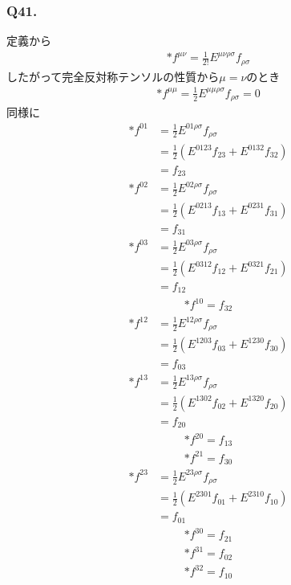 \documentclass[uplatex,a4j,11pt,dvipdfmx]{jsarticle}
\begin{document}
\subsubsection*{Q41.}
定義から
\begin{align}
  *f^{\mu\nu}=\frac{1}{2!}E^{\mu\nu\rho\sigma}f_{\rho\sigma}
\end{align}
したがって完全反対称テンソルの性質から$\mu=\nu$のとき
\begin{align*}
  *f^{\mu\mu}=\frac{1}{2}E^{\mu\mu\rho\sigma}f_{\rho\sigma}=0
\end{align*}
同様に
\begin{align*}
  *f^{01}&=\frac{1}{2}E^{01\rho\sigma}f_{\rho\sigma}\\
  &=\frac{1}{2}\left(E^{0123}f_{23}+E^{0132}f_{32}\right)\\
  &=f_{23}
\end{align*}
\begin{align*}
  *f^{02}&=\frac{1}{2}E^{02\rho\sigma}f_{\rho\sigma}\\
  &=\frac{1}{2}\left(E^{0213}f_{13}+E^{0231}f_{31}\right)\\
  &=f_{31}
\end{align*}
\begin{align*}
  *f^{03}&=\frac{1}{2}E^{03\rho\sigma}f_{\rho\sigma}\\
  &=\frac{1}{2}\left(E^{0312}f_{12}+E^{0321}f_{21}\right)\\
  &=f_{12}
\end{align*}
\begin{align*}
  *f^{10}=f_{32}
\end{align*}
\begin{align*}
  *f^{12}&=\frac{1}{2}E^{12\rho\sigma}f_{\rho\sigma}\\
  &=\frac{1}{2}\left(E^{1203}f_{03}+E^{1230}f_{30}\right)\\
  &=f_{03}
\end{align*}
\begin{align*}
  *f^{13}&=\frac{1}{2}E^{13\rho\sigma}f_{\rho\sigma}\\
  &=\frac{1}{2}\left(E^{1302}f_{02}+E^{1320}f_{20}\right)\\
  &=f_{20}
\end{align*}
\begin{align*}
  *f^{20}=f_{13}
\end{align*}
\begin{align*}
  *f^{21}=f_{30}
\end{align*}
\begin{align*}
  *f^{23}&=\frac{1}{2}E^{23\rho\sigma}f_{\rho\sigma}\\
  &=\frac{1}{2}\left(E^{2301}f_{01}+E^{2310}f_{10}\right)\\
  &=f_{01}
\end{align*}
\begin{align*}
  *f^{30}=f_{21}
\end{align*}
\begin{align*}
  *f^{31}=f_{02}
\end{align*}
\begin{align*}
  *f^{32}=f_{10}
\end{align*}
\end{document}

